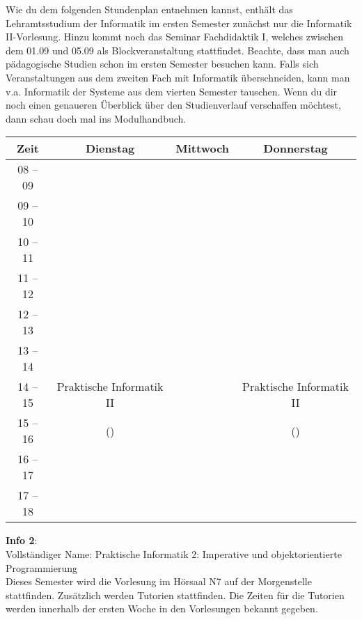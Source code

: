 Wie du dem folgenden Stundenplan entnehmen kannst, enthält das Lehramtsstudium der Informatik im ersten Semester zunächst nur die Informatik II-Vorlesung. Hinzu kommt noch das Seminar Fachdidaktik I, welches zwischen dem 01.09 und 05.09 als Blockveranstaltung stattfindet.
Beachte, dass man auch pädagogische Studien schon im ersten Semester besuchen kann. Falls sich Veranstaltungen aus dem zweiten
Fach mit Informatik überschneiden, kann man v.a. Informatik der Systeme aus dem vierten Semester tauschen.
Wenn du dir noch einen genaueren Überblick über den Studienverlauf verschaffen möchtest, dann schau doch mal ins Modulhandbuch.

\begin{center}
	\begin{tabular}{|c|c|c|c|}
		\hline
		Zeit     & Dienstag                   & Mittwoch & Donnerstag               \\ \hline
		08 -- 09 &                            &          &                          \\ \hline
		09 -- 10 &                            &          &                          \\ \hline
		10 -- 11 &                            &          &                          \\ \hline
		11 -- 12 &                            &          &                          \\ \hline
		12 -- 13 &                            &          &                          \\ \hline
		13 -- 14 &                            &          &                          \\ \hline
		14 -- 15 & Praktische Informatik II   &          & Praktische Informatik II \\ \cline{1-1} \cline{3-3}
		15 -- 16 & (\Infoprof)                &          & (\Infoprof)              \\ \hline
		16 -- 17 &                            &          &           \\ \hline
		17 -- 18 &                            &          &     \\ \hline
		\end{tabular}

\end{center}

\textbf{Info 2}:\\
Vollständiger Name: Praktische Informatik 2: Imperative und objektorientierte Programmierung\\
Dieses Semester wird die Vorlesung im Hörsaal N7 auf der Morgenstelle stattfinden.
Zusätzlich werden Tutorien stattfinden.
Die Zeiten für die Tutorien werden innerhalb der ersten Woche in den Vorlesungen bekannt gegeben.\\
\\